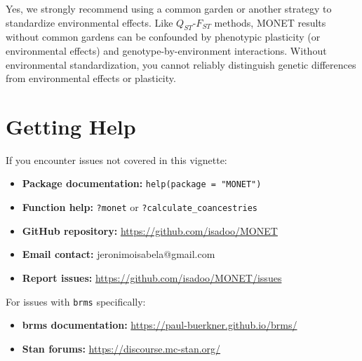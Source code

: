 \documentclass[11pt]{article}
\begin{document}
Yes, we strongly recommend using a common garden or another strategy to standardize environmental effects.  Like $Q_{ST}$-$F_{ST}$ methods, MONET results without common gardens can be confounded by phenotypic plasticity (or environmental effects) and genotype-by-environment interactions.  Without environmental standardization, you cannot reliably distinguish genetic differences from environmental effects or plasticity.


\section{Getting Help}

If you encounter issues not covered in this vignette:

\begin{itemize}
\item \textbf{Package documentation:} \texttt{help(package = "MONET")}
\item \textbf{Function help:} \texttt{?monet} or \texttt{?calculate\_coancestries}
\item \textbf{GitHub repository:} \url{https://github.com/isadoo/MONET}
\item \textbf{Email contact:} jeronimoisabela@gmail.com
\item \textbf{Report issues:} \url{https://github.com/isadoo/MONET/issues}
\end{itemize}

For issues with \texttt{brms} specifically:
\begin{itemize}
\item \textbf{brms documentation:} \url{https://paul-buerkner.github.io/brms/}
\item \textbf{Stan forums:} \url{https://discourse.mc-stan.org/}
\end{itemize}




\end{document}
